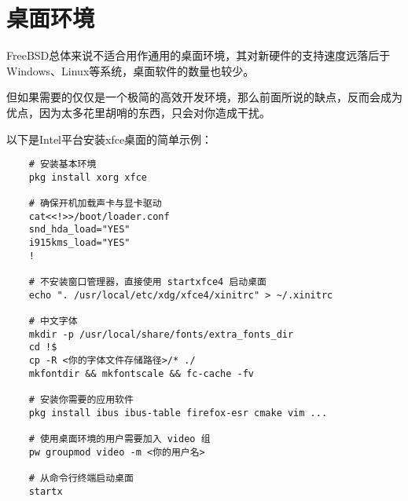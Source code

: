 
\section{桌面环境}

FreeBSD总体来说不适合用作通用的桌面环境，其对新硬件的支持速度远落后于Windows、Linux等系统，桌面软件的数量也较少。

但如果需要的仅仅是一个极简的高效开发环境，那么前面所说的缺点，反而会成为优点，因为太多花里胡哨的东西，只会对你造成干扰。

以下是Intel平台安装xfce桌面的简单示例：

\begin{lstlisting}
    # 安装基本环境
    pkg install xorg xfce

    # 确保开机加载声卡与显卡驱动
    cat<<!>>/boot/loader.conf
    snd_hda_load="YES"
    i915kms_load="YES"
    !

    # 不安装窗口管理器，直接使用 startxfce4 启动桌面
    echo ". /usr/local/etc/xdg/xfce4/xinitrc" > ~/.xinitrc

    # 中文字体
    mkdir -p /usr/local/share/fonts/extra_fonts_dir
    cd !$
    cp -R <你的字体文件存储路径>/* ./
    mkfontdir && mkfontscale && fc-cache -fv

    # 安装你需要的应用软件
    pkg install ibus ibus-table firefox-esr cmake vim ...

    # 使用桌面环境的用户需要加入 video 组
    pw groupmod video -m <你的用户名>

    # 从命令行终端启动桌面
    startx
\end{lstlisting}
